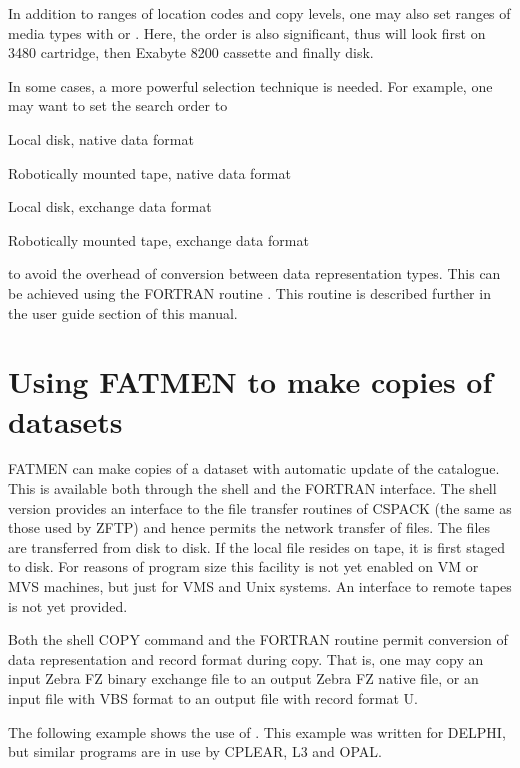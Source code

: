 In addition to ranges of location codes and copy levels,
one may also set ranges of media types with  or
. Here, the order is also significant,
thus  will look first on 3480 cartridge,
then Exabyte 8200 cassette and finally disk.
\par
In some cases, a more powerful selection technique is needed.
For example, one may want to set the search order to
\begin{OL}
\item
Local disk, native data format
\item
Robotically mounted tape, native data format
\item
Local disk, exchange data format
\item
Robotically mounted tape, exchange data format
\end{OL}
to avoid the overhead of conversion between data representation
types. This can be achieved using the FORTRAN routine .
This routine is described further in the user guide section of
this manual.
\section{Using FATMEN to make copies of datasets}
\par
FATMEN can make copies of a dataset with automatic update of the catalogue.
This is available both through the shell and the FORTRAN interface.
The shell version provides an interface to the file transfer
routines of CSPACK (the same as those used by ZFTP) and hence
permits the network transfer of files. The files are transferred
from disk to disk. If the local file resides on tape, it is first
staged to disk. For reasons of program size this facility
is not yet enabled on VM or MVS machines, but just for VMS and Unix
systems. An interface to remote tapes is not yet provided.

Both the shell COPY command and the FORTRAN routine  permit
conversion of data representation and record format during
copy. That is, one may copy an input Zebra FZ binary exchange
file to an output Zebra FZ native file, or an input file
with VBS format to an output file with record format U.

\newpage

The following example shows the use of . This example
was written for DELPHI, but similar programs are in use by
CPLEAR, L3 and OPAL.

